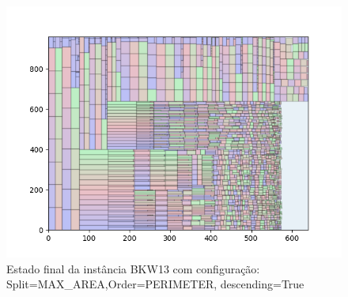 \begin{figure}[H]
    \centering
    \caption[]{Estado final da instância BKW13 com configuração: Split=MAX_AREA,Order=PERIMETER, descending=True}
    \label{fig:bkw13-max_area-perimeter-true}
    \includegraphics[scale=0.5]{output/figures/bkw/bkw13/max_area/perimeter/true/0000}
\end{figure}